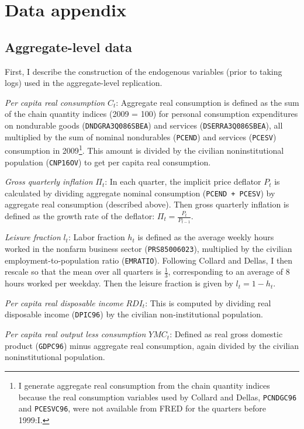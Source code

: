 \section{Data appendix}

\subsection{Aggregate-level data}
\label{aggregate-data-appendix}

First, I describe the construction of the endogenous variables (prior to taking logs) used in the aggregate-level replication.

\textit{Per capita real consumption} $C_t$: Aggregate real consumption is defined as the sum of the chain quantity indices (2009 = 100) for personal consumption expenditures on nondurable goods (\texttt{DNDGRA3Q086SBEA}) and services (\texttt{DSERRA3Q086SBEA}), all multiplied by the sum of nominal nondurables (\texttt{PCEND}) and services (\texttt{PCESV}) consumption in 2009\footnote{I generate aggregate real consumption from the chain quantity indices because the real consumption variables used by Collard and Dellas, \texttt{PCNDGC96} and \texttt{PCESVC96}, were not available from FRED for the quarters before 1999:I.}. This amount is divided by the civilian noninstitutional population (\texttt{CNP16OV}) to get per capita real consumption.

\textit{Gross quarterly inflation} $\Pi_t$: In each quarter, the implicit price deflator $P_t$ is calculated by dividing aggregate nominal consumption (\texttt{PCEND + PCESV}) by aggregate real consumption (described above). Then gross quarterly inflation is defined as the growth rate of the deflator: $\Pi_t = \frac{P_t}{P_{t-1}}$.

\textit{Leisure fraction} $l_t$: Labor fraction $h_t$ is defined as the average weekly hours worked in the nonfarm business sector (\texttt{PRS85006023}), multiplied by the civilian employment-to-population ratio (\texttt{EMRATIO}). Following Collard and Dellas, I then rescale so that the mean over all quarters is $\frac{1}{3}$, corresponding to an average of 8 hours worked per weekday. Then the leisure fraction is given by $l_t = 1 - h_t$.

\textit{Per capita real disposable income} $RDI_t$: This is computed by dividing real disposable income (\texttt{DPIC96}) by the civilian non-institutional population.

\textit{Per capita real output less consumption} $YMC_t$: Defined as real gross domestic product (\texttt{GDPC96}) minus aggregate real consumption, again divided by the civilian noninstitutional population.

